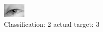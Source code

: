 \begin{figure}[h!]
\begin{center}
\includegraphics[width=0.60\columnwidth]{figures/ID2877_class_2_target_3.png}
\end{center}
\caption{ Classification: 2 actual target: 3}
\label{fig:ID2877_class_2_target_3}
\end{figure}

